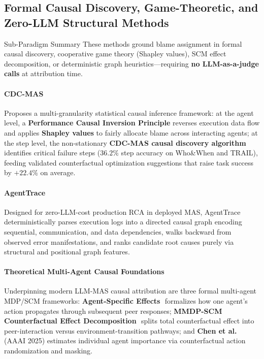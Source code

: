 \subsection{Formal Causal Discovery, Game-Theoretic, and Zero-LLM Structural Methods}\label{sec:causal}
\begin{summarybox}[s5]{Sub-Paradigm Summary \hfill \causalbadge}
These methods ground blame assignment in formal causal discovery, cooperative game theory (Shapley values), SCM effect decomposition, or deterministic graph heuristics---requiring \textbf{no LLM-as-a-judge calls} at attribution time.
\end{summarybox}

\paragraph{CDC-MAS~\citep{ma2025cdcmas}\,\webtag}
Proposes a multi-granularity statistical causal inference framework: at the agent level, a \textbf{Performance Causal Inversion Principle} reverses execution data flow and applies \textbf{Shapley values} to fairly allocate blame across interacting agents; at the step level, the non-stationary \textbf{CDC-MAS causal discovery algorithm} identifies critical failure steps ($36.2\%$ step accuracy on Who\&When and TRAIL), feeding validated counterfactual optimization suggestions that raise task success by $+22.4\%$ on average.

\paragraph{AgentTrace~\citep{wang2026agenttrace}\,\webtag}
Designed for zero-LLM-cost production RCA in deployed MAS, AgentTrace deterministically parses execution logs into a directed causal graph encoding sequential, communication, and data dependencies, walks backward from observed error manifestations, and ranks candidate root causes purely via structural and positional graph features.

\paragraph{Theoretical Multi-Agent Causal Foundations}
Underpinning modern LLM-MAS causal attribution are three formal multi-agent MDP/SCM frameworks: \textbf{Agent-Specific Effects}~\citep{triantafyllou2023ase}\,\webtag formalizes how one agent's action propagates through subsequent peer responses; \textbf{MMDP-SCM Counterfactual Effect Decomposition}~\citep{triantafyllou2024mmdpscm}\,\webtag splits total counterfactual effect into peer-interaction versus environment-transition pathways; and \textbf{Chen et al.}~\citep{chen2025importance}\,\webtag (AAAI 2025) estimates individual agent importance via counterfactual action randomization and masking.

